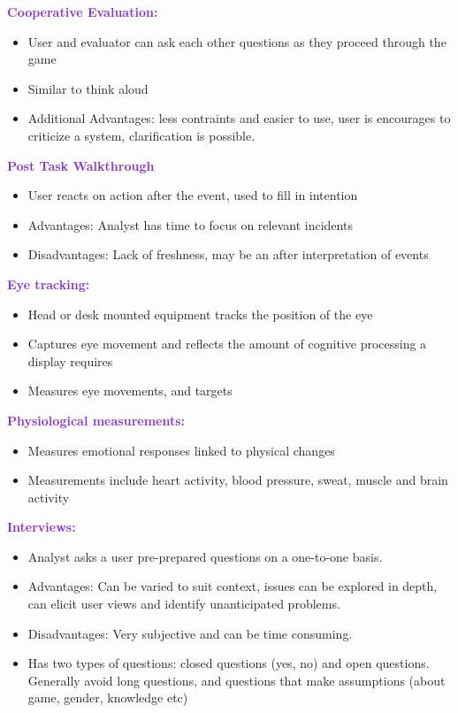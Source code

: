 \documentclass[a4paper,10pt]{article}
\begin{document}
\textcolor{BlueViolet}{\textbf{Cooperative Evaluation:}}
\renewcommand{\labelitemi}{\textperiodcentered}
\begin{itemize}
\item User and evaluator can ask each other questions as they proceed through the game 
\item Similar to think aloud 
\item Additional Advantages: less contraints and easier to use, user is encourages to criticize a system, clarification is possible. 
\end{itemize}
\textcolor{BlueViolet}{\textbf{Post Task Walkthrough}}
\renewcommand{\labelitemi}{\textperiodcentered}
\begin{itemize}
\item User reacts on action after the event, used to fill in intention 
\item Advantages: Analyst has time to focus on relevant incidents 
\item Disadvantages: Lack of freshness, may be an after interpretation of events 
\end{itemize}
\textcolor{BlueViolet}{\textbf{Eye tracking:}}
\renewcommand{\labelitemi}{\textperiodcentered}
\begin{itemize}
\item Head or desk mounted equipment tracks the position of the eye 
\item Captures eye movement and reflects the amount of cognitive processing a display requires 
\item Measures eye movements, and targets 
\end{itemize}
\textcolor{BlueViolet}{\textbf{Physiological measurements: }} 
\renewcommand{\labelitemi}{\textperiodcentered}
\begin{itemize}
\item Measures emotional responses linked to physical changes 
\item Measurements include heart activity, blood pressure, sweat, muscle and brain activity 
\end{itemize}
\textcolor{BlueViolet}{\textbf{Interviews:}}
\renewcommand{\labelitemi}{\textperiodcentered}
\begin{itemize}
\item Analyst asks a user pre-prepared questions on a one-to-one basis. 
\item Advantages: Can be varied to suit context, issues can be explored in depth, can elicit user views and identify unanticipated problems. 
\item Disadvantages: Very subjective and can be time consuming. 
\item Has two types of questions: closed questions (yes, no) and open questions. Generally avoid long questions, and questions that make assumptions (about game, gender, knowledge etc)
\end{itemize}
\end{document}
